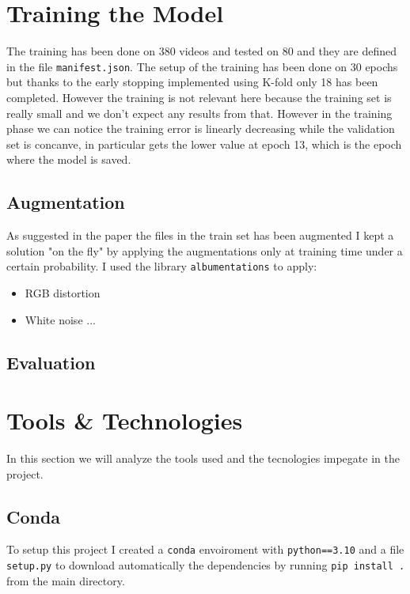 \documentclass[a4paper,12pt]{article}
\begin{document}
\section{Training the Model}
\label{sec:training}

The training has been done on 380 videos and tested on 80 and they are defined in the file \texttt{manifest.json}. The setup of the training has been done on 30 epochs but thanks to the early stopping implemented using K-fold only 18 has been completed. However the training is not relevant here because the training set is really small and we don't expect any results from that. However in the training phase we can notice the training error is linearly decreasing while the validation set is concanve, in particular gets the lower value at epoch 13, which is the epoch where the model is saved. 

\subsection{Augmentation}
As suggested in the paper the files in the train set has been augmented I kept a solution "on the fly" by applying the augmentations only at training time under a certain probability. I used the library \texttt{albumentations} to apply:
\begin{itemize}
    \item RGB distortion
    \item White noise
    ...%
\end{itemize}

\subsection{Evaluation}

\section{Tools \& Technologies}
In this section we will analyze the tools used and the tecnologies impegate in the project. 

\subsection{Conda}
To setup this project I created a \texttt{conda} envoiroment with \texttt{python==3.10} and a file \texttt{setup.py} to download automatically the dependencies by running \texttt{pip install .} from the main directory.
\end{document}
